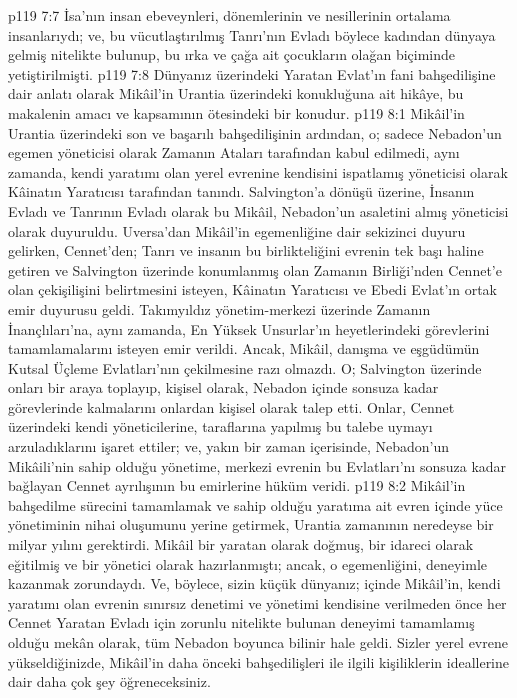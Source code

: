 \vs p119 7:7 İsa’nın insan ebeveynleri, dönemlerinin ve nesillerinin ortalama insanlarıydı; ve, bu vücutlaştırılmış Tanrı’nın Evladı böylece kadından dünyaya gelmiş nitelikte bulunup, bu ırka ve çağa ait çocukların olağan biçiminde yetiştirilmişti.
\vs p119 7:8 Dünyanız üzerindeki Yaratan Evlat’ın fani bahşedilişine dair anlatı olarak Mikâil’in Urantia üzerindeki konukluğuna ait hikâye, bu makalenin amacı ve kapsamının ötesindeki bir konudur.
\vs p119 8:1 Mikâil’in Urantia üzerindeki son ve başarılı bahşedilişinin ardından, o; sadece Nebadon’un egemen yöneticisi olarak Zamanın Ataları tarafından kabul edilmedi, aynı zamanda, kendi yaratımı olan yerel evrenine kendisini ispatlamış yöneticisi olarak Kâinatın Yaratıcısı tarafından tanındı. Salvington’a dönüşü üzerine, İnsanın Evladı ve Tanrının Evladı olarak bu Mikâil, Nebadon’un asaletini almış yöneticisi olarak duyuruldu. Uversa’dan Mikâil’in egemenliğine dair sekizinci duyuru gelirken, Cennet’den; Tanrı ve insanın bu birlikteliğini evrenin tek başı haline getiren ve Salvington üzerinde konumlanmış olan Zamanın Birliği’nden Cennet’e olan çekişilişini belirtmesini isteyen, Kâinatın Yaratıcısı ve Ebedi Evlat’ın ortak emir duyurusu geldi. Takımyıldız yönetim\hyp{}merkezi üzerinde Zamanın İnançlıları’na, aynı zamanda, En Yüksek Unsurlar’ın heyetlerindeki görevlerini tamamlamalarını isteyen emir verildi. Ancak, Mikâil, danışma ve eşgüdümün Kutsal Üçleme Evlatları’nın çekilmesine razı olmazdı. O; Salvington üzerinde onları bir araya toplayıp, kişisel olarak, Nebadon içinde sonsuza kadar görevlerinde kalmalarını onlardan kişisel olarak talep etti. Onlar, Cennet üzerindeki kendi yöneticilerine, taraflarına yapılmış bu talebe uymayı arzuladıklarını işaret ettiler; ve, yakın bir zaman içerisinde, Nebadon’un Mikâili’nin sahip olduğu yönetime, merkezi evrenin bu Evlatları’nı sonsuza kadar bağlayan Cennet ayrılışının bu emirlerine hüküm veridi.
\vs p119 8:2 Mikâil’in bahşedilme sürecini tamamlamak ve sahip olduğu yaratıma ait evren içinde yüce yönetiminin nihai oluşumunu yerine getirmek, Urantia zamanının neredeyse bir milyar yılını gerektirdi. Mikâil bir yaratan olarak doğmuş, bir idareci olarak eğitilmiş ve bir yönetici olarak hazırlanmıştı; ancak, o egemenliğini, deneyimle kazanmak zorundaydı. Ve, böylece, sizin küçük dünyanız; içinde Mikâil’in, kendi yaratımı olan evrenin sınırsız denetimi ve yönetimi kendisine verilmeden önce her Cennet Yaratan Evladı için zorunlu nitelikte bulunan deneyimi tamamlamış olduğu mekân olarak, tüm Nebadon boyunca bilinir hale geldi. Sizler yerel evrene yükseldiğinizde, Mikâil’in daha önceki bahşedilişleri ile ilgili kişiliklerin ideallerine dair daha çok şey öğreneceksiniz.
